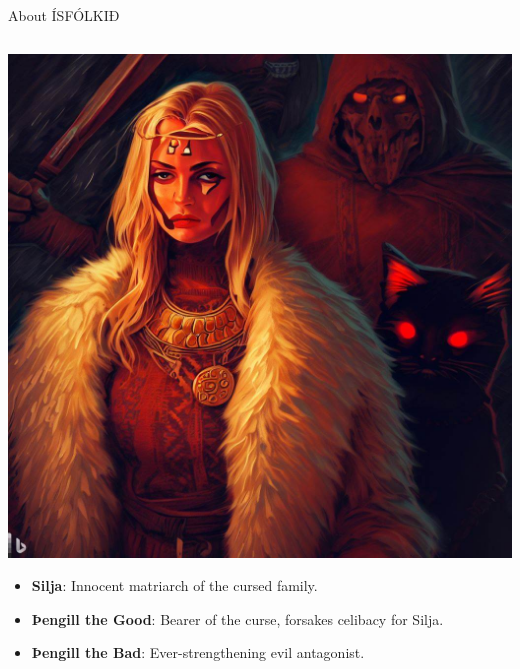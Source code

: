 \begin{frame}{About ÍSFÓLKIÐ}
\begin{columns}[T]
        \begin{column}{0.35\textwidth}
            \includegraphics[width=\textwidth]{../figures/dalle-ísfólkið}
            {\scriptsize\begin{itemize}
                \item \textbf{Silja}: Innocent matriarch of the cursed family.
                \item \textbf{Þengill the Good}: Bearer of the curse, forsakes celibacy for Silja.
                \item \textbf{Þengill the Bad}: Ever-strengthening evil antagonist.
            \end{itemize}}
        \end{column}
    \end{columns}
\end{frame}

